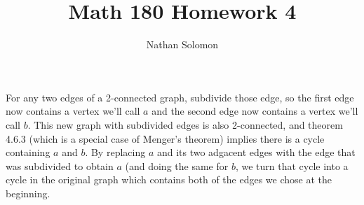 \documentclass[12pt]{article}
\begin{document}
\title{Math 180 Homework 4}
\author{Nathan Solomon}
\maketitle

\section{}
\noindent{}\bigskip\par
For any two edges of a 2-connected graph, subdivide those edge, so the first edge now contains a vertex we'll call $a$ and the second edge now contains a vertex we'll call $b$. This new graph with subdivided edges is also 2-connected, and theorem 4.6.3 (which is a special case of Menger's theorem) implies there is a cycle containing $a$ and $b$. By replacing $a$ and its two adgacent edges with the edge that was subdivided to obtain $a$ (and doing the same for $b$, we turn that cycle into a cycle in the original graph which contains both of the edges we chose at the beginning.
\end{document}
